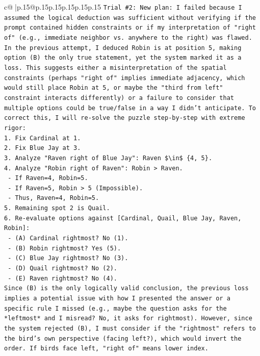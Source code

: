 \documentclass{article}
\begin{document}
{\begin{supertabular}{c@{$\;$}|p{.15\linewidth}@{}p{.15\linewidth}p{.15\linewidth}p{.15\linewidth}p{.15\linewidth}p{.15\linewidth}}
{{{\texttt{Trial \#2: New plan: I failed because I assumed the logical deduction was sufficient without verifying if the prompt contained hidden constraints or if my interpretation of "right of" (e.g., immediate neighbor vs. anywhere to the right) was flawed. In the previous attempt, I deduced Robin is at position 5, making option (B) the only true statement, yet the system marked it as a loss. This suggests either a misinterpretation of the spatial constraints (perhaps "right of" implies immediate adjacency, which would still place Robin at 5, or maybe the "third from left" constraint interacts differently) or a failure to consider that multiple options could be true/false in a way I didn't anticipate. To correct this, I will re{-}solve the puzzle step{-}by{-}step with extreme rigor:} \\
\texttt{1. Fix Cardinal at 1.} \\
\texttt{2. Fix Blue Jay at 3.} \\
\texttt{3. Analyze "Raven right of Blue Jay": Raven \$\textbackslash{}in\$ \{4, 5\}.} \\
\texttt{4. Analyze "Robin right of Raven": Robin > Raven.} \\
\texttt{   {-} If Raven=4, Robin=5.} \\
\texttt{   {-} If Raven=5, Robin > 5 (Impossible).} \\
\texttt{   {-} Thus, Raven=4, Robin=5.} \\
\texttt{5. Remaining spot 2 is Quail.} \\
\texttt{6. Re{-}evaluate options against {[}Cardinal, Quail, Blue Jay, Raven, Robin{]}:} \\
\texttt{   {-} (A) Cardinal rightmost? No (1).} \\
\texttt{   {-} (B) Robin rightmost? Yes (5).} \\
\texttt{   {-} (C) Blue Jay rightmost? No (3).} \\
\texttt{   {-} (D) Quail rightmost? No (2).} \\
\texttt{   {-} (E) Raven rightmost? No (4).} \\
\texttt{Since (B) is the only logically valid conclusion, the previous loss implies a potential issue with how I presented the answer or a specific rule I missed (e.g., maybe the question asks for the *leftmost* and I misread? No, it asks for rightmost). However, since the system rejected (B), I must consider if the "rightmost" refers to the bird's own perspective (facing left?), which would invert the order. If birds face left, "right of" means lower index.} \\
}}}
\end{supertabular}}
\end{document}

